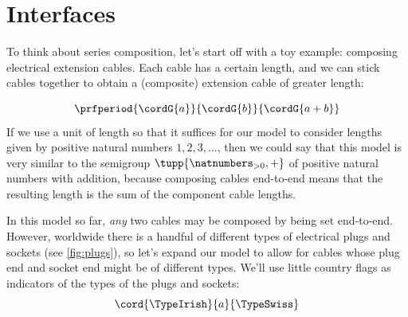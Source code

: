 
\section{Interfaces}\label{sec:interfaces}


To think about series composition, let's start off with a toy example: composing electrical extension cables. Each cable has a certain length, and we can stick cables together to obtain a (composite) extension cable of greater length:
%


\begin{equation}
    \prfperiod{
        \cordG{a}
    }{
       \cordG{b}
    }{
        \cordG{a + b}
    }
\end{equation}
%
If we use a unit of length so that it suffices for our model to consider lengths given by positive natural numbers $1, 2, 3, \dots$, then we could say that this model is very similar to the semigroup $\tupp{\natnumbers_{>0},+}$ of positive natural numbers with addition, because composing cables end-to-end means that the resulting length is the sum of the component cable lengths. 

In this model so far, \emph{any} two cables may be composed by being set end-to-end. However, worldwide there is a handful of different types of electrical plugs and sockets (see \cref{fig:plugs}), so let's expand our model to allow for cables whose plug end and socket end might be of different types. We'll use little country flags as indicators of the types of the plugs and sockets: 
\begin{equation}
    \label{eq:want}
    {\cord{\TypeIrish}{a}{\TypeSwiss}}
\end{equation}

\begin{marginfigure}
    \centering











    \caption{Plug/socket types used in the world}
    \label{fig:plugs}
\end{marginfigure}

